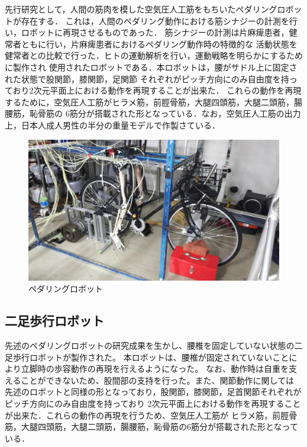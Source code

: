 先行研究として，人間の筋肉を模した空気圧人工筋をもちいたペダリングロボットが存在する．
これは，人間のペダリング動作における筋シナジーの計測を行い，ロボットに再現させるものであった．
筋シナジーの計測は片麻痺患者，健常者ともに行い，片麻痺患者におけるペダリング動作時の特徴的な
活動状態を健常者との比較で行った．ヒトの運動解析を行い，運動戦略を明らかにするために製作され
使用されたロボットである．本ロボットは，腰がサドル上に固定された状態で股関節，膝関節，足関節
それぞれがピッチ方向にのみ自由度を持っており2次元平面上における動作を再現することが出来た．
これらの動作を再現するために，空気圧人工筋がヒラメ筋，前脛骨筋，大腿四頭筋，大腿二頭筋，腸腰筋，恥骨筋の
6筋分が搭載された形となっている．なお，空気圧人工筋の出力上，日本人成人男性の半分の重量モデルで作製さている．%
\begin{figure}[h]
 \begin{center}
  \includegraphics[width=0.75\columnwidth,clip]{./1_prolusion/1st.eps}
  \caption{ペダリングロボット}
  \label{初号機}
  \end{center} %
\end{figure}

\newpage

\subsection{二足歩行ロボット}
先述のペダリングロボットの研究成果を生かし、腰椎を固定していない状態の二足歩行ロボットが製作された。
本ロボットは、腰椎が固定されていないことにより立脚時の歩容動作の再現を行えるようになった。
なお、動作時は自重を支えることができないため、股間部の支持を行った。また、関節動作に関しては
先述のロボットと同様の形となっており，股関節，膝関節，足首関節それぞれがピッチ方向にのみ自由度を持っており
2次元平面上における動作を再現することが出来た．これらの動作の再現を行うため、空気圧人工筋が
ヒラメ筋，前脛骨筋，大腿四頭筋，大腿二頭筋，腸腰筋，恥骨筋の6筋分が搭載された形となっている．

